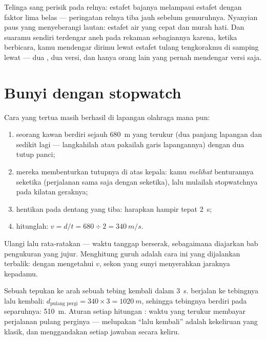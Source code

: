 \begin{example}\label{ex:g7:sound-production:scenes}
Telinga sang perisik pada relnya: estafet bajanya melampaui estafet
 dengan faktor lima belas --- peringatan relnya tiba jauh
sebelum gemuruhnya. Nyanyian paus yang menyeberangi lautan: estafet
air yang cepat dan murah hati. Dan suaramu sendiri terdengar aneh pada
rekaman sebagiannya karena, ketika berbicara, kamu mendengar dirimu
lewat estafet tulang tengkorakmu di samping lewat  --- dua
, dua versi, dan hanya orang lain yang pernah mendengar versi
 saja.
\end{example}

\section{Bunyi dengan stopwatch}

\begin{method}\label{met:g7:sound-production:measure}
Cara yang tertua masih berhasil di lapangan olahraga mana pun:
\begin{enumerate}
  \item seorang kawan berdiri sejauh \qty{680}{m} yang terukur (dua
        panjang lapangan dan sedikit lagi --- langkahilah atau
        pakailah garis lapangannya) dengan dua tutup panci;
  \item mereka membenturkan tutupnya di atas kepala: kamu
        \emph{melihat} benturannya seketika (perjalanan 
        sama saja dengan seketika), lalu mulailah stopwatchnya pada
        kilatan geraknya;
  \item hentikan pada dentang yang tiba: harapkan hampir tepat
        \qty{2}{s};
  \item hitunglah: $v = d/t = 680 \div 2 = \qty{340}{m/s}$.
\end{enumerate}
Ulangi lalu rata-ratakan --- waktu tanggap berserak, sebagaimana
diajarkan bab pengukuran yang jujur. Menghitung guruh adalah cara ini
yang dijalankan terbalik: dengan mengetahui $v$, sekon yang sunyi
menyerahkan jaraknya kepadamu.
\end{method}

\begin{example}\label{ex:g7:sound-production:echo}
Sebuah tepukan ke arah sebuah tebing kembali dalam \qty{3}{s}. 
berjalan ke tebingnya lalu kembali: $d_{\text{pulang pergi}} = 340 \times 3 =
\qty{1020}{m}$, sehingga tebingnya berdiri pada separuhnya:
\qty{510}{m}. Aturan setiap hitungan : waktu yang terukur membayar
perjalanan pulang perginya --- melupakan ``lalu kembali'' adalah
kekeliruan yang klasik, dan menggandakan setiap jawaban secara keliru.
\end{example}

